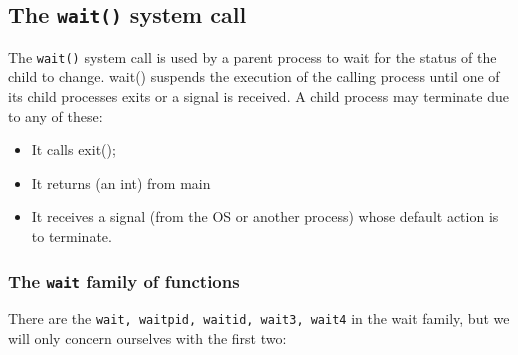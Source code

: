 \documentclass[a4paper]{article}
\begin{document}
\subsection{The \texttt{wait()} system call}
The \texttt{wait()} system call is used by a parent process to wait for the status of the child to change. wait() suspends the execution of the calling process until one of its child processes exits or a signal is received. A child process may terminate due to any of these:
\begin{itemize}
    \item It calls exit();
    \item It returns (an int) from main
    \item It receives a signal (from the OS or another process) whose default action is to terminate. 
\end{itemize}


\subsubsection{The \texttt{wait} family of functions}
There are the \texttt{wait, waitpid, waitid, wait3, wait4} in the wait family, but we will only concern ourselves with the first two:
\end{document}
